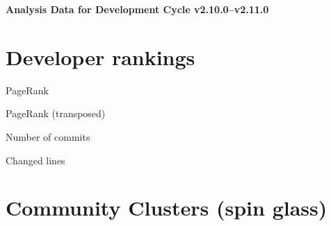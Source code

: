 \documentclass{article}
\begin{document}
\setlength{\parindent}{0pt}
\begin{center}
\begin{Large}
\textbf{Analysis Data for Development Cycle v2.10.0--v2.11.0}
\end{Large}
\end{center}
\section{Developer rankings}
\begin{small}\renewcommand{\tabcolsep}{1pt}
\begin{minipage}{0.5\linewidth}
PageRank\\

\end{minipage}%
\begin{minipage}{0.5\linewidth}
PageRank (transposed)\\

\end{minipage}

\renewcommand{\tabcolsep}{5pt}
\begin{minipage}{0.5\linewidth}
Number of commits\\

\end{minipage}%
\begin{minipage}{0.5\linewidth}
Changed lines\\

\end{minipage}
\end{small}
\newpage\section{Community Clusters (spin glass)}
\end{document}
